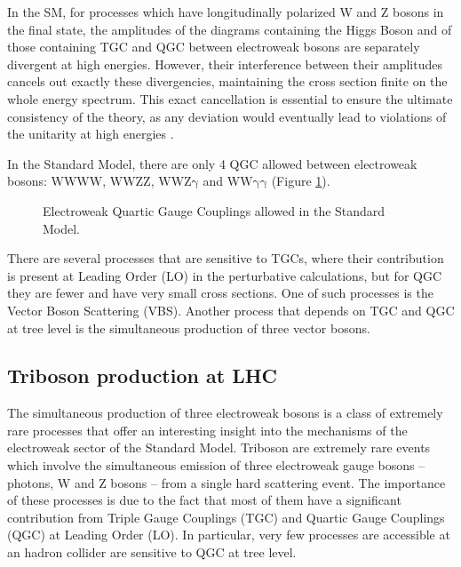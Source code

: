 In the SM, for processes which have longitudinally polarized W and Z bosons in the final state,
the amplitudes of the diagrams containing the Higgs Boson and of those containing TGC and QGC between electroweak bosons are separately divergent at high energies.
However, their interference between their amplitudes cancels out exactly these divergencies, maintaining the cross section finite on the whole energy spectrum.
This exact cancellation is essential to ensure the ultimate consistency of the theory, as any deviation would eventually lead to violations of the unitarity at high energies \cite{PhysRevLett.38.883}.

In the Standard Model, there are only 4 QGC allowed between electroweak bosons: $\mathrm{WWWW}$, $\mathrm{WWZZ}$, $\mathrm{WWZ\gamma}$ and $\mathrm{WW\gamma\gamma}$ (Figure \ref{fig:EWQGC}).
\begin{figure}[ht]
  \centering
  \caption{Electroweak Quartic Gauge Couplings allowed in the Standard Model.}
  \label{fig:EWQGC}
\end{figure}

There are several processes that are sensitive to TGCs, where their contribution is present at Leading Order (LO) in the perturbative calculations,
but for QGC they are fewer and have very small cross sections.
One of such processes is the Vector Boson Scattering (VBS).
Another process that depends on TGC and QGC at tree level is the simultaneous production of three vector bosons.

\subsection{Triboson production at LHC}
The simultaneous production of three electroweak bosons is a class of extremely rare processes that offer an interesting insight into the mechanisms of the electroweak sector of the Standard Model.
Triboson are extremely rare events which involve the simultaneous emission of three electroweak gauge bosons -- photons, W and Z bosons -- from a single hard scattering event.
The importance of these processes is due to the fact that most of them have a significant contribution from Triple Gauge Couplings (TGC) and Quartic Gauge Couplings (QGC) at Leading Order (LO).
In particular, very few processes are accessible at an hadron collider are sensitive to QGC at tree level.

